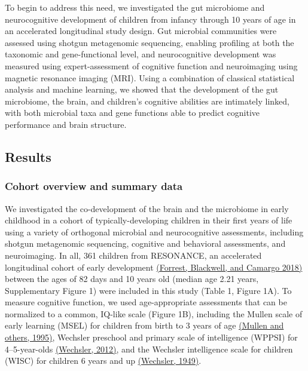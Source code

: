 \documentclass[
]{article}
\begin{document}
To begin to address this need, we investigated the gut microbiome and
neurocognitive development of children from infancy through 10 years of
age in an accelerated longitudinal study design. Gut microbial
communities were assessed using shotgun metagenomic sequencing, enabling
profiling at both the taxonomic and gene-functional level, and
neurocognitive development was measured using expert-assessment of
cognitive function and neuroimaging using magnetic resonance imaging
(MRI). Using a combination of classical statistical analysis and machine
learning, we showed that the development of the gut microbiome, the
brain, and children's cognitive abilities are intimately linked, with
both microbial taxa and gene functions able to predict cognitive
performance and brain structure.

\hypertarget{results}{%
\subsection{Results}\label{results}}

\hypertarget{cohort-overview-and-summary-data}{%
\subsubsection{Cohort overview and summary
data}\label{cohort-overview-and-summary-data}}

We investigated the co-development of the brain and the microbiome in
early childhood in a cohort of typically-developing children in their
first years of life using a variety of orthogonal microbial and
neurocognitive assessments, including shotgun metagenomic sequencing,
cognitive and behavioral assessments, and neuroimaging. In all, 361
children from RESONANCE, an accelerated longitudinal cohort of early
development \href{https://paperpile.com/c/dPbU4e/klxU}{(Forrest,
Blackwell, and Camargo 2018)} between the ages of 82 days and 10 years
old (median age 2.21 years, Supplementary Figure 1) were included in
this study (Table 1, Figure 1A). To measure cognitive function, we used
age-appropriate assessments that can be normalized to a common, IQ-like
scale (Figure 1B), including the Mullen scale of early learning (MSEL)
for children from birth to 3 years of age
\href{https://www.zotero.org/google-docs/?90hfYr}{(Mullen and others,
1995)}, Wechsler preschool and primary scale of intelligence (WPPSI) for
4--5-year-olds
\href{https://www.zotero.org/google-docs/?wCfx5h}{(Wechsler, 2012)}, and
the Wechsler intelligence scale for children (WISC) for children 6 years
and up \href{https://www.zotero.org/google-docs/?AcNN3S}{(Wechsler,
1949)}.
\end{document}
